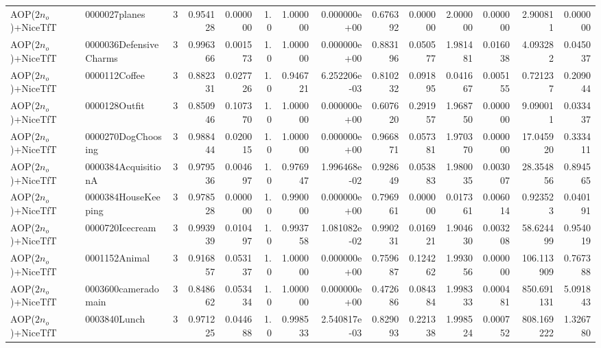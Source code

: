 \begin{tabular}{llrr|r|rr|rr|rr|rrr}
     AOP($2 n_o$)+NiceTfT &          0000027planes &       3 & 0.954128 & 0.000000 &  1.0 &      1.000000 & 0.000000e+00 &      0.676392 & 0.000000 &      2.000000 &    0.000000 &     2.900811 &    0.000000 \\
     AOP($2 n_o$)+NiceTfT & 0000036DefensiveCharms &       3 & 0.996366 & 0.001573 &  1.0 &      1.000000 & 0.000000e+00 &      0.883196 & 0.050577 &      1.981481 &    0.016038 &     4.093282 &    0.045037 \\
     AOP($2 n_o$)+NiceTfT &          0000112Coffee &       3 & 0.882331 & 0.027726 &  1.0 &      0.946721 & 6.252206e-03 &      0.810232 & 0.091895 &      0.041667 &    0.005155 &     0.721237 &    0.209044 \\
     AOP($2 n_o$)+NiceTfT &          0000128Outfit &       3 & 0.850946 & 0.107370 &  1.0 &      1.000000 & 0.000000e+00 &      0.607620 & 0.291957 &      1.968750 &    0.000000 &     9.090011 &    0.033437 \\
     AOP($2 n_o$)+NiceTfT &     0000270DogChoosing &       3 & 0.988444 & 0.020015 &  1.0 &      1.000000 & 0.000000e+00 &      0.966871 & 0.057381 &      1.970370 &    0.000000 &    17.045920 &    0.333411 \\
     AOP($2 n_o$)+NiceTfT &    0000384AcquisitionA &       3 & 0.979536 & 0.004697 &  1.0 &      0.976947 & 1.996468e-02 &      0.928649 & 0.053883 &      1.980035 &    0.003007 &    28.354856 &    0.894565 \\
     AOP($2 n_o$)+NiceTfT &    0000384HouseKeeping &       3 & 0.978528 & 0.000000 &  1.0 &      0.990000 & 0.000000e+00 &      0.796961 & 0.000000 &      0.017361 &    0.006014 &     0.923523 &    0.040191 \\
     AOP($2 n_o$)+NiceTfT &        0000720Icecream &       3 & 0.993939 & 0.010497 &  1.0 &      0.993758 & 1.081082e-02 &      0.990231 & 0.016921 &      1.904630 &    0.003208 &    58.624499 &    0.954019 \\
     AOP($2 n_o$)+NiceTfT &          0001152Animal &       3 & 0.916857 & 0.053137 &  1.0 &      1.000000 & 0.000000e+00 &      0.759687 & 0.124262 &      1.993056 &    0.000000 &   106.113909 &    0.767388 \\
     AOP($2 n_o$)+NiceTfT &    0003600cameradomain &       3 & 0.848662 & 0.053434 &  1.0 &      1.000000 & 0.000000e+00 &      0.472686 & 0.084384 &      1.998333 &    0.000481 &   850.691131 &    5.091843 \\
     AOP($2 n_o$)+NiceTfT &           0003840Lunch &       3 & 0.971225 & 0.044688 &  1.0 &      0.998533 & 2.540817e-03 &      0.829093 & 0.221338 &      1.998524 &    0.000752 &   808.169222 &    1.326780 \\

\end{tabular}
